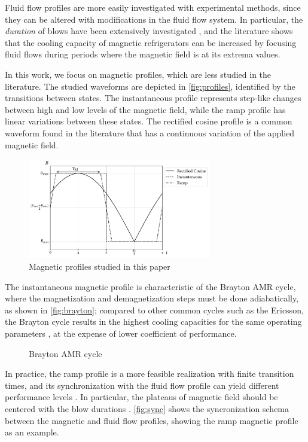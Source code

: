 \documentclass[referee]{svjour3}
\begin{document}
Fluid flow profiles are more easily investigated with experimental methods, since they can be altered with modifications in the fluid flow system. In particular, the \emph{duration} of blows have been extensively investigated \cite{bib:teyber17_exper,bib:nakashima18-influen-exp,FORTKAMP2018}, and the literature shows that the cooling capacity of magnetic refrigerators can be increased by focusing fluid flows during periods where the magnetic field is at its extrema values.

In this work, we focus on magnetic profiles, which are less studied in the literature. The studied waveforms are depicted in \autoref{fig:profiles}, identified by the transitions between states. The instantaneous profile represents step-like changes between high and low levels of the magnetic field, while the ramp profile has linear variations between these states. The rectified cosine profile is a common waveform found in the literature that has a continuous variation of the applied magnetic field.

\begin{figure}[!ht]
  \centering
  \includegraphics[width=8cm]{profiles_all}
  \caption{Magnetic profiles studied in this paper}
  \label{fig:profiles}
\end{figure}

The instantaneous magnetic profile is characteristic of the Brayton AMR cycle, where the magnetization and demagnetization steps must be done adiabatically, as shown in \autoref{fig:brayton}; compared to other common cycles such as the Ericsson, the Brayton cycle results in the highest cooling capacities for the same operating  parameters \cite{bib:kitanovski}, at the expense of lower coefficient of performance.


\begin{figure}[!ht]
  \centering
  
  \caption{Brayton AMR cycle}
  \label{fig:brayton}
\end{figure}

 In practice, the ramp profile is a more feasible realization with finite transition times, and its synchronization with the fluid flow profile can yield different performance levels \cite{TUSEK20111507}. In particular, the plateaus of magnetic field should be centered with the blow durations \cite{bib:bjoerk11_amr}.
\autoref{fig:sync} shows the syncronization schema between the magnetic and fluid flow profiles, showing the ramp magnetic profile as an example. 
\end{document}
